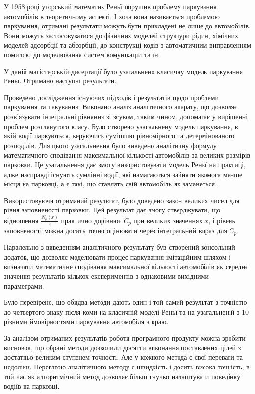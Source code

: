 
У 1958 році угорський математик Реньї порушив проблему паркування автомобілів в теоретичному аспекті. І хоча вона називається проблемою паркування, отримані результати можуть бути прикладені не лише до автомобілів. Вони можуть застосовуватися до фізичних моделей структури рідин, хімічних моделей адсорбції та абсорбції, до конструкці кодів з автоматичним виправленням помилок, до моделювання систем комунікацій та ін.

У даній магістерській дисертації було узагальнено класичну модель паркування Реньї. Отримано наступні результати.

Проведено дослідження існуючих підходів і результатів щодо проблеми паркування та пакування. Виконано аналіз аналітичного апарату, що дозволяє розв'язувати інтегральні рівняння зі зсувом, таким чином, допомагає у вирішенні проблем розглянутого класу. Було створено узагальнену модель паркування, в якій водії паркуються, керуючись сумішшю рівномірного та детермінованого розподілів. Для цього узагальнення було виведено аналітичну формулу математичного сподівання максимальної кількості автомобілів за великих розмірів парковки. Це узагальнення дає змогу використовувати модель Реньї на практиці, адже насправді існують сумлінні водії, які намагаються зайняти якомога менше місця на парковці, а є такі, що ставлять свій автомобіль як заманеться.

Використовуючи отриманий результат, було доведено закон великих чисел для рівня заповненості парковки. Цей результат дає змогу стверджувати, що відношення $\frac{N_{p}(x)}{x}$ практично дорівнює $C_{p}$ при великих значеннях $x$, і рівень заповненості можна досить точно оцінювати через інтегральний вираз для $C_{p}$.

Паралельно з виведенням аналітичного результату був створений консольний додаток, що дозволяє моделювати процес паркування імітаційним шляхом і визначати математичне сподівання максимальної кількості автомобілів як середнє значення результатів кількох експериментів з однаковими вихідними параметрами.

Було перевірено, що обидва методи дають один і той самий результат з точністю до четвертого знаку після коми на класичній моделі Реньї та на узагальненій з 10 різними ймовірностями паркування автомобіля з краю.

За аналізом отриманих результатів роботи програмного продукту можна зробити висновок, що обрані методи дозволили досягти виконання поставлених цілей з достатньо великим ступенем точності. Але у кожного метода є свої переваги та недоліки. Перевагою аналітичного методу є швидкість і досить висока точність, в той час як алгоритмічний метод дозволяє більш гнучко налаштувати поведінку водіїв на парковці.

